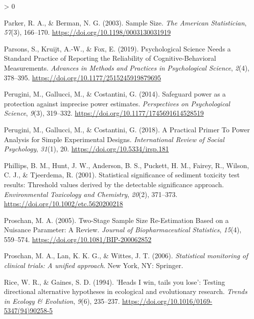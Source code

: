 \documentclass[
  english,
  ,jou, a4paper,floatsintext]{apa6}
\newlength{\cslhangindent}
\newenvironment{CSLReferences}[2] %
 {%
  \setlength{\parindent}{0pt}
  \ifodd #1 \everypar{\setlength{\hangindent}{\cslhangindent}}\ignorespaces\fi
  \ifnum #2 > 0
  \setlength{\parskip}{#2\baselineskip}
  \fi
 }%
 {}
\begin{document}
\begin{CSLReferences}{1}{0}
\leavevmode\hypertarget{ref-parker_sample_2003}{}%
Parker, R. A., \& Berman, N. G. (2003). Sample {Size}. \emph{The American Statistician}, \emph{57}(3), 166--170. \url{https://doi.org/10.1198/0003130031919}

\leavevmode\hypertarget{ref-parsons_psychological_2019}{}%
Parsons, S., Kruijt, A.-W., \& Fox, E. (2019). Psychological {Science Needs} a {Standard Practice} of {Reporting} the {Reliability} of {Cognitive}-{Behavioral Measurements}. \emph{Advances in Methods and Practices in Psychological Science}, \emph{2}(4), 378--395. \url{https://doi.org/10.1177/2515245919879695}

\leavevmode\hypertarget{ref-perugini_safeguard_2014}{}%
Perugini, M., Gallucci, M., \& Costantini, G. (2014). Safeguard power as a protection against imprecise power estimates. \emph{Perspectives on Psychological Science}, \emph{9}(3), 319--332. \url{https://doi.org/10.1177/1745691614528519}

\leavevmode\hypertarget{ref-perugini_practical_2018}{}%
Perugini, M., Gallucci, M., \& Costantini, G. (2018). A {Practical Primer To Power Analysis} for {Simple Experimental Designs}. \emph{International Review of Social Psychology}, \emph{31}(1), 20. \url{https://doi.org/10.5334/irsp.181}

\leavevmode\hypertarget{ref-phillips_statistical_2001}{}%
Phillips, B. M., Hunt, J. W., Anderson, B. S., Puckett, H. M., Fairey, R., Wilson, C. J., \& Tjeerdema, R. (2001). Statistical significance of sediment toxicity test results: Threshold values derived by the detectable significance approach. \emph{Environmental Toxicology and Chemistry}, \emph{20}(2), 371--373. \url{https://doi.org/10.1002/etc.5620200218}

\leavevmode\hypertarget{ref-proschan_two-stage_2005}{}%
Proschan, M. A. (2005). Two-{Stage Sample Size Re}-{Estimation Based} on a {Nuisance Parameter}: A {Review}. \emph{Journal of Biopharmaceutical Statistics}, \emph{15}(4), 559--574. \url{https://doi.org/10.1081/BIP-200062852}

\leavevmode\hypertarget{ref-proschan_statistical_2006}{}%
Proschan, M. A., Lan, K. K. G., \& Wittes, J. T. (2006). \emph{Statistical monitoring of clinical trials: A unified approach}. {New York, NY}: {Springer}.

\leavevmode\hypertarget{ref-rice_heads_1994}{}%
Rice, W. R., \& Gaines, S. D. (1994). '{Heads I} win, tails you lose': Testing directional alternative hypotheses in ecological and evolutionary research. \emph{Trends in Ecology \& Evolution}, \emph{9}(6), 235--237. \url{https://doi.org/10.1016/0169-5347(94)90258-5}


\end{CSLReferences}
\end{document}
